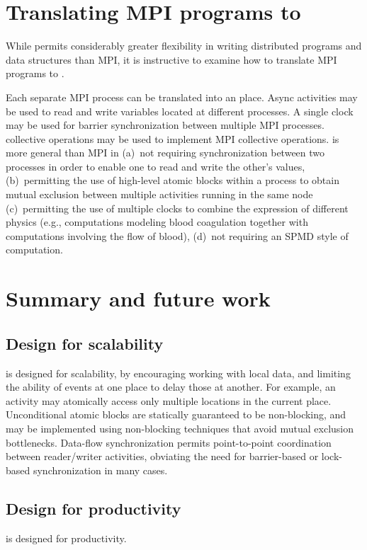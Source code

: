\section{Translating MPI programs to \Xten{}}

While \Xten{} permits considerably greater flexibility in writing
distributed programs and data structures than MPI, it is instructive
to examine how to translate MPI programs to \Xten.

Each separate MPI process can be translated into an \Xten{}
place. Async activities may be used to read and write variables
located at different processes. A single clock may be used for barrier
synchronization between multiple MPI processes. \Xten{} collective
operations may be used to implement MPI collective operations.
\Xten{} is more general than MPI in (a)~not requiring synchronization
between two processes in order to enable one to read and write the
other's values, (b)~permitting the use of high-level atomic blocks
within a process to obtain mutual exclusion between multiple
activities running in the same node (c)~permitting the use of multiple
clocks to combine the expression of different physics (e.g.,
computations modeling blood coagulation together with computations
involving the flow of blood), (d)~not requiring an SPMD style of
computation.


\section{Summary and future work}
\subsection{Design for scalability}
\Xten{} is designed for scalability, by encouraging working with local data,
and limiting the ability of events at one place to delay those at another. For
example, an activity may atomically access only multiple locations in the
current place. Unconditional atomic blocks are statically guaranteed to be
non-blocking, and may be implemented using non-blocking techniques that avoid
mutual exclusion bottlenecks. Data-flow synchronization permits point-to-point
coordination between reader/writer activities, obviating the need for
barrier-based or lock-based synchronization in many cases.

\subsection{Design for productivity}
\Xten{} is designed for productivity.

